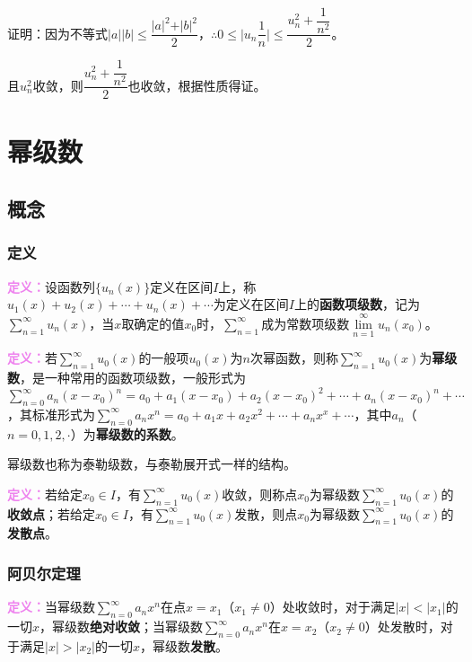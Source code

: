 \documentclass[UTF8, 12pt]{ctexart}
\begin{document}
        证明：因为不等式$\vert a\vert\vert b\vert\leqslant\dfrac{\vert a\vert^2+\vert b\vert^2}{2}$，$\therefore0\leqslant\vert u_n\dfrac{1}{n}\vert\leqslant\dfrac{u_n^2+\dfrac{1}{n^2}}{2}$。

        且$u_n^2$收敛，则$\dfrac{u_n^2+\dfrac{1}{n^2}}{2}$也收敛，根据性质得证。

        \section{幂级数}

        \subsection{概念}

        \subsubsection{定义}

        \textcolor{violet}{\textbf{定义：}}设函数列$\{u_n(x)\}$定义在区间$I$上，称$u_1(x)+u_2(x)+\cdots+u_n(x)+\cdots$为定义在区间$I$上的\textbf{函数项级数}，记为$\sum\limits_{n=1}^\infty u_n(x)$，当$x$取确定的值$x_0$时，$\sum\limits_{n=1}^\infty$成为常数项级数$\lim\limits_{n=1}^\infty u_n(x_0)$。

        \textcolor{violet}{\textbf{定义：}}若$\sum\limits_{n=1}^\infty u_0(x)$的一般项$u_0(x)$为$n$次幂函数，则称$\sum\limits_{n=1}^\infty u_0(x)$为\textbf{幂级数}，是一种常用的函数项级数，一般形式为$\sum\limits_{n=0}^\infty a_n(x-x_0)^n=a_0+a_1(x-x_0)+a_2(x-x_0)^2+\cdots+a_n(x-x_0)^n+\cdots$，其标准形式为$\sum\limits_{n=0}^\infty a_nx^n=a_0+a_1x+a_2x^2+\cdots+a_nx^x+\cdots$，其中$a_n$（$n=0,1,2,\cdot$）为\textbf{幂级数的系数}。

        幂级数也称为泰勒级数，与泰勒展开式一样的结构。

        \textcolor{violet}{\textbf{定义：}}若给定$x_0\in I$，有$\sum\limits_{n=1}^\infty u_0(x)$收敛，则称点$x_0$为幂级数$\sum\limits_{n=1}^\infty u_0(x)$的\textbf{收敛点}；若给定$x_0\in I$，有$\sum\limits_{n=1}^\infty u_0(x)$发散，则点$x_0$为幂级数$\sum\limits_{n=1}^\infty u_0(x)$的\textbf{发散点}。

        \subsubsection{阿贝尔定理}

        \textcolor{violet}{\textbf{定义：}}当幂级数$\sum\limits_{n=0}^\infty a_nx^n$在点$x=x_1$（$x_1\neq0$）处收敛时，对于满足$\vert x\vert<\vert x_1\vert$的一切$x$，幂级数\textbf{绝对收敛}；当幂级数$\sum\limits_{n=0}^\infty a_nx^n$在$x=x_2$（$x_2\neq0$）处发散时，对于满足$\vert x\vert>\vert x_2\vert$的一切$x$，幂级数\textbf{发散}。
\end{document}
